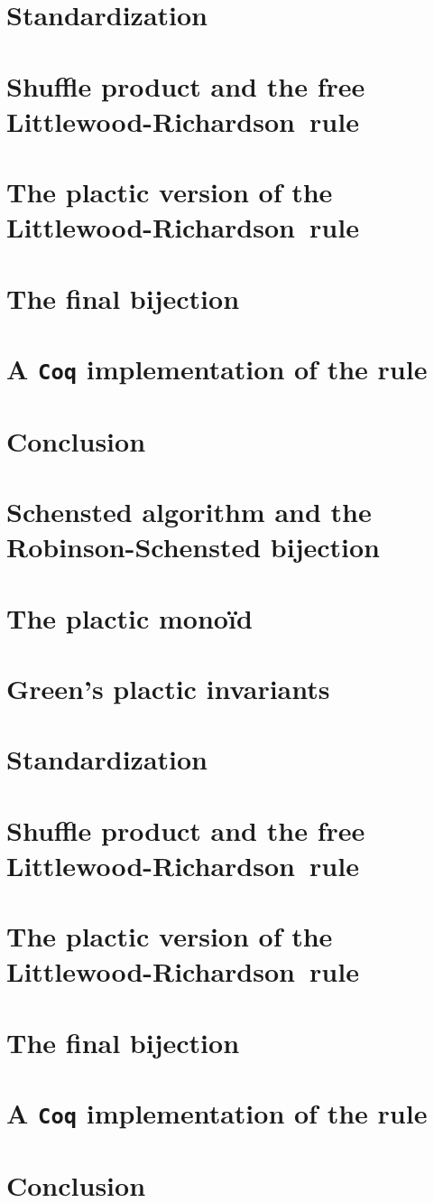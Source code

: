 \documentclass[12pt,a4paper]{article}
\newcommand{\Coq}{\texttt{Coq}\xspace}
\newcommand{\LR}{Littlewood-Richardson\ }
\begin{document}
\section{Standardization}

\section{Shuffle product and the free \LR rule}

\section{The plactic version of the \LR rule}

\section{The final bijection}

\section{A \Coq implementation of the rule}

\section{Conclusion}

\section{Schensted algorithm and the Robinson-Schensted bijection}

\section{The plactic monoïd}

\section{Green's plactic invariants}

\section{Standardization}

\section{Shuffle product and the free \LR rule}

\section{The plactic version of the \LR rule}

\section{The final bijection}

\section{A \Coq implementation of the rule}

\section{Conclusion}
\end{document}
